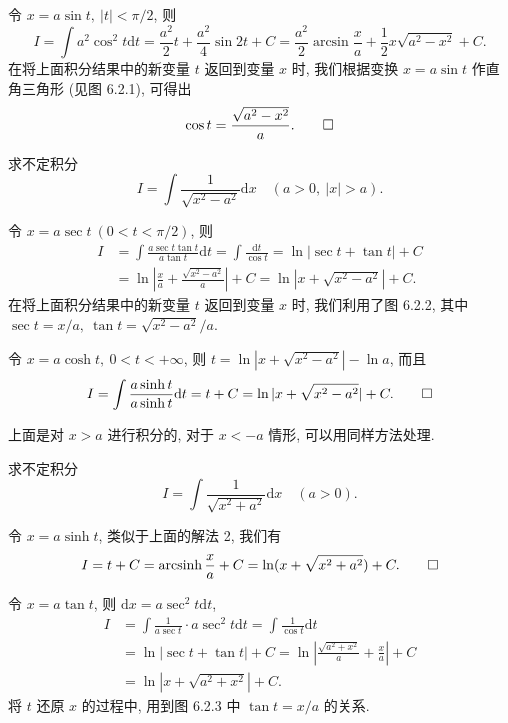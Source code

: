 \begin{solve}
令 $x=a\sin t,\ |t|<\pi/2$, 则
\[
  I=\int a^2\cos^2t\mathrm dt
  =
  \frac{a^2}2t+\frac{a^2}4\sin2t+C
  =
  \frac{a^2}2\arcsin\frac xa+\frac12x\sqrt{a^2-x^2}+C.
\]
在将上面积分结果中的新变量 $t$ 返回到变量 $x$ 时, 我们根据变换 $x=a\sin t$ 作直角三角形 (见图 6.2.1), 可得出
\[
  \cos t=\frac{\sqrt{a^2-x^2}}{a}.
\qedhere
\]
\end{solve}


\begin{example}\label{example:ma-6-2-15}
求不定积分
\[
  I=\int\frac1{\sqrt{x^2-a^2}}\mathrm dx\quad (a>0,\ |x|>a).
\]
\end{example}


\begin{solve}[{解法 1}]
令 $x=a\sec t\ (0<t<\pi/2)$, 则
\[
\begin{aligned}
  I
  &=
  \int\frac{a\sec t\tan t}{a\tan t}\mathrm dt
  =
  \int\frac{\mathrm dt}{\cos t}
  =
  \ln|\sec t+\tan t|+C\\
  &=
  \ln\left|\frac xa+\frac{\sqrt{x^2-a^2}}a\right|+C
  =
  \ln|x+\sqrt{x^2-a^2}|+C.
\end{aligned}
\]
在将上面积分结果中的新变量 $t$ 返回到变量 $x$ 时, 我们利用了图 6.2.2, 其中 $\sec t=x/a,\ \tan t=\sqrt{x^2-a^2}/a$.
\end{solve}


\begin{solve}[{解法 2}]
令 $x=a\cosh t,\ 0<t<+\infty$, 则 $t=\ln|x+\sqrt{x^2-a^2}|-\ln a$, 而且
\[
  I=\int\frac{a\sinh t}{a\sinh t}\mathrm dt
  =
  t+C
  =
  \ln|x+\sqrt{x^2-a^2}|+C.
\qedhere
\]
\end{solve}


\begin{remark}\label{remark:ma-6-source-51}
上面是对 $x>a$ 进行积分的, 对于 $x<-a$ 情形, 可以用同样方法处理.
\end{remark}


\begin{example}\label{example:ma-6-2-16}
求不定积分
\[
  I=\int\frac1{\sqrt{x^2+a^2}}\mathrm dx\quad (a>0).
\]
\end{example}


\begin{solve}[{解法 1}]
令 $x=a\sinh t$, 类似于上面的解法 2, 我们有
\[
  I=t+C=\operatorname{arcsinh}\frac xa+C
  =
  \ln(x+\sqrt{x^2+a^2})+C.
\qedhere
\]
\end{solve}


\begin{solve}[{解法 2}]
令 $x=a\tan t$, 则 $\mathrm dx=a\sec^2t\mathrm dt$,
\[
\begin{aligned}
  I
  &=
  \int\frac1{a\sec t}\cdot a\sec^2t\mathrm dt
  =
  \int\frac1{\cos t}\mathrm dt\\
  &=
  \ln|\sec t+\tan t|+C
  =
  \ln\left|\frac{\sqrt{a^2+x^2}}a+\frac xa\right|+C\\
  &=
  \ln|x+\sqrt{a^2+x^2}|+C.
\end{aligned}
\]
将 $t$ 还原 $x$ 的过程中, 用到图 6.2.3 中 $\tan t=x/a$ 的关系.
\end{solve}


